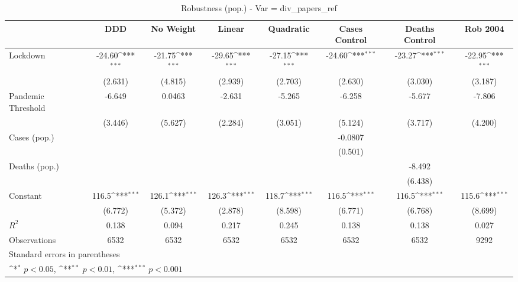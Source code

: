 \documentclass{article}
\begin{document}
{
\def\sym#1{\ifmmode^{#1}\else\(^{#1}\)\fi}
\begin{longtable}{l*{7}{c}}
\caption{Robustness (pop.) - Var = div\_papers\_ref}\\
\hline\hline\endfirsthead\hline\endhead\hline\endfoot\endlastfoot
                &\multicolumn{1}{c}{DDD}&\multicolumn{1}{c}{No Weight}&\multicolumn{1}{c}{Linear}&\multicolumn{1}{c}{Quadratic}&\multicolumn{1}{c}{Cases Control}&\multicolumn{1}{c}{Deaths Control}&\multicolumn{1}{c}{Rob 2004}\\
\hline
Lockdown        &   -24.60\sym{***}&   -21.75\sym{***}&   -29.65\sym{***}&   -27.15\sym{***}&   -24.60\sym{***}&   -23.27\sym{***}&   -22.95\sym{***}\\
                &  (2.631)         &  (4.815)         &  (2.939)         &  (2.703)         &  (2.630)         &  (3.030)         &  (3.187)         \\
Pandemic Threshold&   -6.649         &   0.0463         &   -2.631         &   -5.265         &   -6.258         &   -5.677         &   -7.806         \\
                &  (3.446)         &  (5.627)         &  (2.284)         &  (3.051)         &  (5.124)         &  (3.717)         &  (4.200)         \\
Cases (pop.)    &                  &                  &                  &                  &  -0.0807         &                  &                  \\
                &                  &                  &                  &                  &  (0.501)         &                  &                  \\
Deaths (pop.)   &                  &                  &                  &                  &                  &   -8.492         &                  \\
                &                  &                  &                  &                  &                  &  (6.438)         &                  \\
Constant        &    116.5\sym{***}&    126.1\sym{***}&    126.3\sym{***}&    118.7\sym{***}&    116.5\sym{***}&    116.5\sym{***}&    115.6\sym{***}\\
                &  (6.772)         &  (5.372)         &  (2.878)         &  (8.598)         &  (6.771)         &  (6.768)         &  (8.699)         \\
\hline
\(R^{2}\)       &    0.138         &    0.094         &    0.217         &    0.245         &    0.138         &    0.138         &    0.027         \\
Observations    &     6532         &     6532         &     6532         &     6532         &     6532         &     6532         &     9292         \\
\hline\hline
\multicolumn{8}{l}{\footnotesize Standard errors in parentheses}\\
\multicolumn{8}{l}{\footnotesize \sym{*} \(p<0.05\), \sym{**} \(p<0.01\), \sym{***} \(p<0.001\)}\\
\end{longtable}
}
\end{document}
